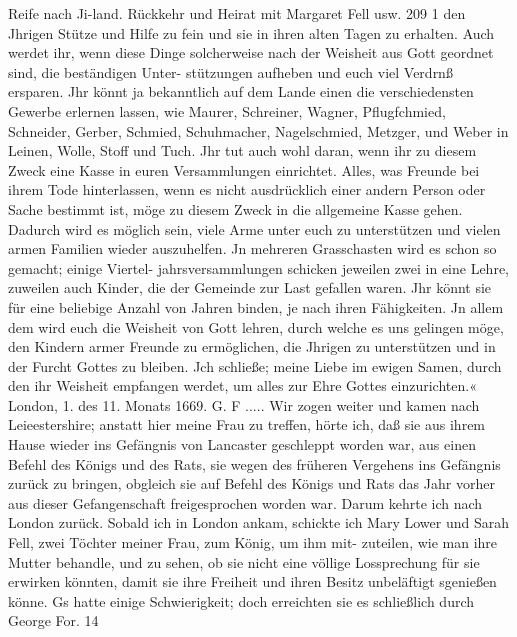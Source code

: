 Reife nach Ji-land. Rückkehr und Heirat mit Margaret Fell usw. 209 1
den Jhrigen Stütze und Hilfe zu fein und sie in ihren alten Tagen
zu erhalten. Auch werdet ihr, wenn diese Dinge solcherweise nach
der Weisheit aus Gott geordnet sind, die beständigen Unter-
stützungen aufheben und euch viel Verdrnß ersparen. Jhr könnt
ja bekanntlich auf dem Lande einen die verschiedensten Gewerbe
erlernen lassen, wie Maurer, Schreiner, Wagner, Pflugfchmied,
Schneider, Gerber, Schmied, Schuhmacher, Nagelschmied, Metzger,
und Weber in Leinen, Wolle, Stoff und Tuch. Jhr tut auch
wohl daran, wenn ihr zu diesem Zweck eine Kasse in euren
Versammlungen einrichtet. Alles, was Freunde bei ihrem Tode
hinterlassen, wenn es nicht ausdrücklich einer andern Person
oder Sache bestimmt ist, möge zu diesem Zweck in die allgemeine
Kasse gehen. Dadurch wird es möglich sein, viele Arme unter
euch zu unterstützen und vielen armen Familien wieder auszuhelfen.
Jn mehreren Grasschasten wird es schon so gemacht; einige Viertel-
jahrsversammlungen schicken jeweilen zwei in eine Lehre, zuweilen
auch Kinder, die der Gemeinde zur Last gefallen waren. Jhr
könnt sie für eine beliebige Anzahl von Jahren binden, je nach
ihren Fähigkeiten. Jn allem dem wird euch die Weisheit von
Gott lehren, durch welche es uns gelingen möge, den Kindern
armer Freunde zu ermöglichen, die Jhrigen zu unterstützen und in
der Furcht Gottes zu bleiben. Jch schließe; meine Liebe im
ewigen Samen, durch den ihr Weisheit empfangen werdet, um
alles zur Ehre Gottes einzurichten.«
London, 1. des 11. Monats 1669. G. F .....
Wir zogen weiter und kamen nach Leieestershire; anstatt
hier meine Frau zu treffen, hörte ich, daß sie aus ihrem Hause
wieder ins Gefängnis von Lancaster geschleppt worden war,
aus einen Befehl des Königs und des Rats, sie wegen des
früheren Vergehens ins Gefängnis zurück zu bringen, obgleich
sie auf Befehl des Königs und Rats das Jahr vorher aus dieser
Gefangenschaft freigesprochen worden war. Darum kehrte ich nach
London zurück.
Sobald ich in London ankam, schickte ich Mary Lower und
Sarah Fell, zwei Töchter meiner Frau, zum König, um ihm mit-
zuteilen, wie man ihre Mutter behandle, und zu sehen, ob sie
nicht eine völlige Lossprechung für sie erwirken könnten, damit sie
ihre Freiheit und ihren Besitz unbeläftigt sgenießen könne. Gs
hatte einige Schwierigkeit; doch erreichten sie es schließlich durch
George For. 14

